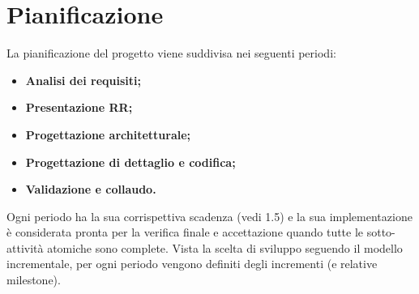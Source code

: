 \section{Pianificazione}
La pianificazione del progetto viene suddivisa nei seguenti periodi:
\begin{itemize}
	\item \textbf{Analisi dei requisiti;}
	\item \textbf{Presentazione RR;}
	\item \textbf{Progettazione architetturale;}
	\item \textbf{Progettazione di dettaglio e codifica;}
	\item \textbf{Validazione e collaudo.}
\end{itemize}
Ogni periodo ha la sua corrispettiva scadenza (vedi 1.5) e la sua implementazione è considerata pronta per la verifica finale e accettazione quando tutte le sotto-attività atomiche sono complete. Vista la scelta di sviluppo seguendo il modello incrementale, per ogni periodo vengono definiti degli incrementi (e relative milestone).

